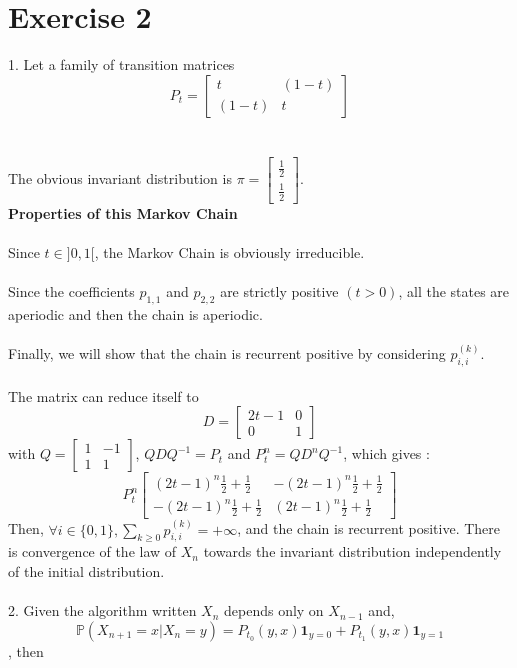 	\section*{Exercise 2}
	1. Let a family of transition matrices $$ P_t = \begin{bmatrix} t & (1-t) \\ (1-t) & t \end{bmatrix} $$~\\
	~\\
	The obvious invariant distribution is $\pi=\begin{bmatrix} \frac{1}{2} \\ \frac{1}{2} \end{bmatrix}$.
	~\\
	\textbf{Properties of this Markov Chain}~\\
	~\\
	Since $t \in ]0,1[$, the Markov Chain is obviously irreducible. ~\\
	~\\
	Since the coefficients $p_{1,1}$ and $p_{2,2}$ are strictly positive $(t > 0)$, all the states are aperiodic and then the chain is aperiodic.~\\
	~\\
	Finally, we will show that the chain is recurrent positive by considering $p^{(k)}_{i,i}$.~\\
	~\\
	The matrix can reduce itself to 
	$$D = \begin{bmatrix} 2t-1 & 0 \\ 0 & 1 \end{bmatrix} $$
	with $Q = \begin{bmatrix} 1 & -1 \\ 1 & 1 \end{bmatrix}$,
	$QDQ^{-1}=P_{t}$ and $P_{t}^{n}=QD^{n}Q^{-1}$,
	which gives : 
	$$P_{t}^{n} \begin{bmatrix} (2t-1)^{n}\frac{1}{2}+ \frac{1}{2} & -(2t-1)^{n}\frac{1}{2}+ \frac{1}{2} \\ -(2t-1)^{n}\frac{1}{2}+ \frac{1}{2} & (2t-1)^{n}\frac{1}{2}+ \frac{1}{2} \end{bmatrix} $$
	Then, $ \forall i \in \{0,1\}, \sum_{k \geq 0} p_{i,i}^{(k)} = +\infty$, and the chain is recurrent positive.
	There is convergence of the law of $X_n$ towards the invariant distribution independently of the initial distribution.~\\
	~\\
	2. Given the algorithm written $X_n$ depends only on $X_{n-1}$ and, $$\mathbb{P}(X_{n+1}=x | X_{n}=y)= P_{t_0}(y,x)\textbf{1}_{y=0}+P_{t_1}(y,x)\textbf{1}_{y=1}$$, then 
	
